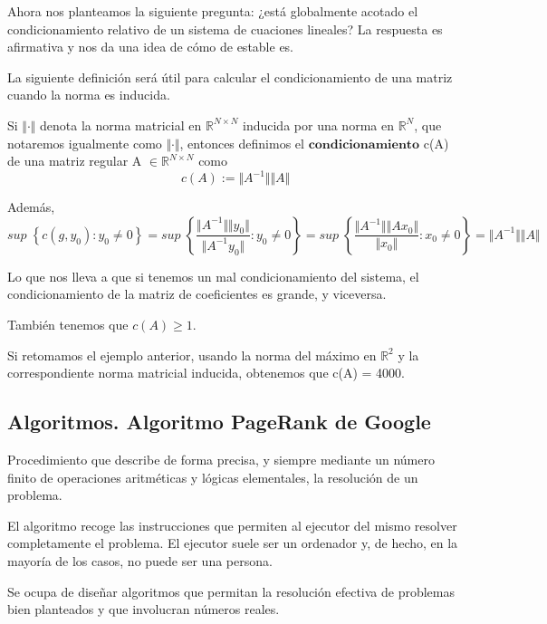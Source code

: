 Ahora nos planteamos la siguiente pregunta: ¿está globalmente acotado el condicionamiento relativo de un sistema de cuaciones lineales? La respuesta es afirmativa y nos da una idea de cómo de estable es.

La siguiente definición será útil para calcular el condicionamiento de una matriz cuando la norma es inducida.

\begin{ndef}
Si $\Vert \cdot \Vert$ denota la norma matricial en $\mathbb{R}^{N \times N}$ inducida por una norma en $\mathbb{R}^N$, que notaremos igualmente como $\Vert \cdot \Vert$, entonces definimos el $\textbf{condicionamiento}$ c(A) de una matriz regular A $\in \mathbb{R}^{N \times N}$ como
\[ c(A) := \Vert A^{-1} \Vert \Vert A \Vert \]
\end{ndef}

Además,
\[ sup \; \left\lbrace c(g, y_0) : y_0 \neq 0 \right\rbrace = sup \; \left\lbrace \frac{\Vert A^{-1} \Vert \Vert y_0 \Vert}{\Vert A^{-1}y_0 \Vert} : y_0 \neq 0 \right\rbrace = sup \; \left\lbrace \frac{\Vert A^{-1} \Vert \Vert Ax_0 \Vert}{\Vert x_0 \Vert} : x_0 \neq 0 \right\rbrace = \Vert A^{-1} \Vert \Vert A \Vert \]

Lo que nos lleva a que si tenemos un mal condicionamiento del sistema, el condicionamiento de la matriz de coeficientes es grande, y viceversa.

También tenemos que $c(A) \geq 1$.

Si retomamos el ejemplo anterior, usando la norma del máximo en $\mathbb{R}^2$ y la correspondiente norma matricial inducida, obtenemos que c(A) = 4000.

\subsection{Algoritmos. Algoritmo PageRank de Google}

\begin{ndef}[Algoritmo]
Procedimiento que describe de forma precisa, y siempre mediante un número finito de operaciones aritméticas y lógicas elementales, la resolución de un problema.
\end{ndef}

El algoritmo recoge las instrucciones que permiten al ejecutor del mismo resolver completamente el problema. El ejecutor suele ser un ordenador y, de hecho, en la mayoría de los casos, no puede ser una persona.

\begin{ndef}
Se ocupa de diseñar algoritmos que permitan la resolución efectiva de problemas bien planteados y que involucran números reales.
\end{ndef}

